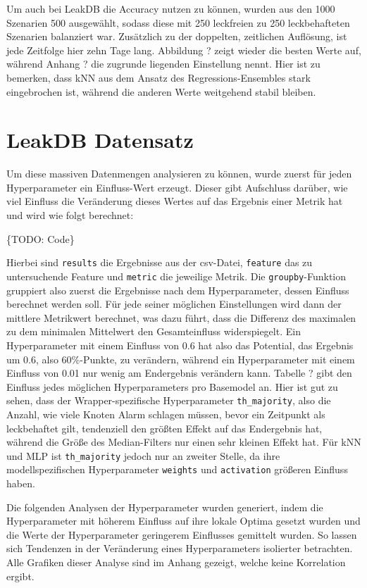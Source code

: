Um auch bei LeakDB die Accuracy nutzen zu können, wurden aus den 1000 Szenarien 500 ausgewählt, sodass diese
 mit 250 leckfreien zu 250 leckbehafteten Szenarien balanziert war. Zusätzlich zu der doppelten, zeitlichen
 Auflösung, ist jede Zeitfolge hier zehn Tage lang. Abbildung ? zeigt wieder die besten Werte auf, während
 Anhang ? die zugrunde liegenden Einstellung nennt. Hier ist zu bemerken, dass kNN aus dem Ansatz des
 Regressions-Ensembles stark eingebrochen ist, während die anderen Werte weitgehend stabil bleiben.

\section{LeakDB Datensatz}

Um diese massiven Datenmengen analysieren zu können, wurde zuerst für jeden Hyperparameter ein Einfluss-Wert
 erzeugt. Dieser gibt Aufschluss darüber, wie viel Einfluss die Veränderung dieses Wertes auf das Ergebnis
 einer Metrik hat und wird wie folgt berechnet:

\{TODO: Code\}

Hierbei sind \texttt{results} die Ergebnisse aus der csv-Datei, \texttt{feature} das zu untersuchende Feature
 und \texttt{metric} die jeweilige Metrik. Die \texttt{groupby}-Funktion gruppiert also zuerst die Ergebnisse
 nach dem Hyperparameter, dessen Einfluss berechnet werden soll. Für jede seiner möglichen Einstellungen wird
 dann der mittlere Metrikwert berechnet, was dazu führt, dass die Differenz des maximalen zu dem minimalen
 Mittelwert den Gesamteinfluss widerspiegelt. Ein Hyperparameter mit einem Einfluss von 0.6 hat also das
 Potential, das Ergebnis um 0.6, also 60\%-Punkte, zu verändern, während ein Hyperparameter mit einem Einfluss
 von 0.01 nur wenig am Endergebnis verändern kann. Tabelle ? gibt den Einfluss jedes möglichen Hyperparameters
 pro Basemodel an. Hier ist gut zu sehen, dass der Wrapper-spezifische Hyperparameter \texttt{th\_majority},
 also die Anzahl, wie viele Knoten Alarm schlagen müssen, bevor ein Zeitpunkt als leckbehaftet gilt, tendenziell
 den größten Effekt auf das Endergebnis hat, während die Größe des Median-Filters nur einen sehr kleinen Effekt
 hat. Für kNN und MLP ist \texttt{th\_majority} jedoch nur an zweiter Stelle, da ihre modellspezifischen
 Hyperparameter \texttt{weights} und \texttt{activation} größeren Einfluss haben.

Die folgenden Analysen der Hyperparameter wurden generiert, indem die Hyperparameter mit höherem Einfluss auf
 ihre lokale Optima gesetzt wurden und die Werte der Hyperparameter geringerem Einflusses gemittelt wurden.
 So lassen sich Tendenzen in der Veränderung eines Hyperparameters isolierter betrachten. Alle Grafiken dieser
 Analyse sind im Anhang gezeigt, welche keine Korrelation ergibt.

